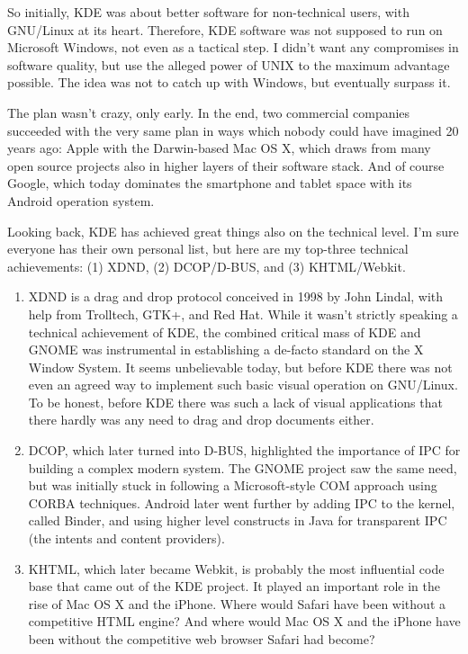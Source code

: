 So initially, KDE was about better software for non-technical users, with GNU/Linux at its heart.  Therefore, KDE software was not supposed to run on Microsoft Windows, not even as a tactical step. I didn’t want any compromises in software quality, but use the alleged power of UNIX to the maximum advantage possible. The idea was not to catch up with Windows, but eventually surpass it.
 
The plan wasn’t crazy, only early. In the end, two commercial companies succeeded with the very same plan in ways which nobody could have imagined 20 years ago: Apple with the Darwin-based Mac OS X, which draws from many open source projects also in higher layers of their software stack. And of course Google, which today dominates the smartphone and tablet space with its Android operation system.
 
Looking back, KDE has achieved great things also on the technical level. I’m sure everyone has their own personal list, but here are my top-three technical achievements:  (1) XDND, (2) DCOP/D-BUS, and (3) KHTML/Webkit.
 
\begin{enumerate}
 \item XDND is a drag and drop protocol conceived in 1998 by John Lindal, with help from Trolltech, GTK+, and Red Hat. While it wasn’t strictly speaking a technical achievement of KDE, the combined critical mass of KDE and GNOME was instrumental in establishing a de-facto standard on the X Window System. It seems unbelievable today, but before KDE there was not even an agreed way to implement such basic visual operation on GNU/Linux. To be honest, before KDE there was such a lack of visual applications that there hardly was any need to drag and drop documents either.
 \item DCOP, which later turned into D-BUS, highlighted the importance of IPC for building a complex modern system. The GNOME project saw the same need, but was initially stuck in following a Microsoft-style COM approach using CORBA techniques. Android later went further by adding IPC to the kernel, called Binder, and using higher level constructs in Java for transparent IPC (the intents and content providers).
 \item KHTML, which later became Webkit, is probably the most influential code base that came out of the KDE project. It played an important role in the rise of Mac OS X and the iPhone. Where would Safari have been without a competitive HTML engine? And where would Mac OS X and the iPhone have been without the competitive web browser Safari had become?
\end{enumerate}

